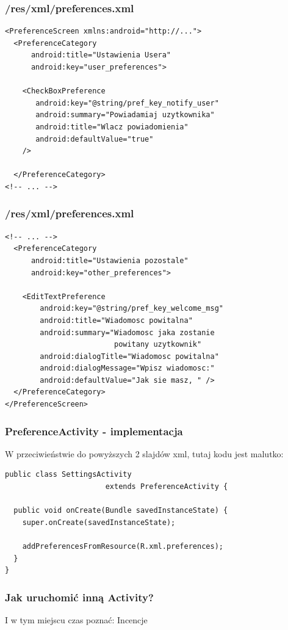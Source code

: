 \documentclass{beamer}
\begin{document}
\begin{frame}[fragile]\frametitle{/res/\textbf{xml/preferences.xml}}
\begin{lstlisting} 
<PreferenceScreen xmlns:android="http://...">
  <PreferenceCategory 
      android:title="Ustawienia Usera"
      android:key="user_preferences">
       
    <CheckBoxPreference 
       android:key="@string/pref_key_notify_user"
       android:summary="Powiadamiaj uzytkownika"
       android:title="Wlacz powiadomienia" 
       android:defaultValue="true"
    />
            
  </PreferenceCategory>
<!-- ... -->
\end{lstlisting}
\end{frame}

\begin{frame}[fragile]\frametitle{/res/\textbf{xml/preferences.xml}}
\begin{lstlisting}
<!-- ... -->
  <PreferenceCategory 
      android:title="Ustawienia pozostale"
      android:key="other_preferences">

    <EditTextPreference
        android:key="@string/pref_key_welcome_msg"
        android:title="Wiadomosc powitalna" 
        android:summary="Wiadomosc jaka zostanie 
                         powitany uzytkownik"
        android:dialogTitle="Wiadomosc powitalna"
        android:dialogMessage="Wpisz wiadomosc:"    
        android:defaultValue="Jak sie masz, " />
  </PreferenceCategory>
</PreferenceScreen>
\end{lstlisting}
\end{frame}

\begin{frame}[fragile]\frametitle{PreferenceActivity - implementacja}
\begin{center}
W przeciwieństwie do powyższych 2 slajdów xml, tutaj kodu jest malutko:
\end{center}
\begin{lstlisting}
public class SettingsActivity 
                       extends PreferenceActivity {

  public void onCreate(Bundle savedInstanceState) {
    super.onCreate(savedInstanceState);

    addPreferencesFromResource(R.xml.preferences);
  }
}
\end{lstlisting}
\end{frame}

\begin{frame}\frametitle{Jak uruchomić inną Activity?}
\begin{center}
I w tym miejscu czas poznać:
\large{Incencje}
\end{center}
\end{frame}
\end{document}
